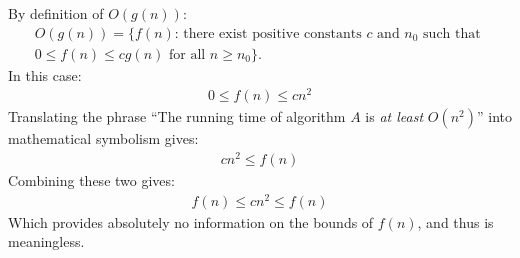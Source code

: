 By definition of $O(g(n))$:
\begin{eqnarray*}
	O(g(n)) = \{f(n) \text{: there exist positive constants } c \text{ and } n_0 \text{ such that } \\
	0 \leq f(n) \leq c g(n) \text{ for all } n \geq n_0 \}.
\end{eqnarray*}
In this case:
\begin{eqnarray*}
	0 \leq f(n) \leq c n^2
\end{eqnarray*}
Translating the phrase ``The running time of algorithm $A$ is \textit{at least} $O(n^2)$'' into mathematical symbolism gives:
\begin{eqnarray*}
	c n^2 \leq f(n)
\end{eqnarray*}
Combining these two gives:
\begin{eqnarray*}
	f(n) \leq c n^2 \leq f(n)
\end{eqnarray*}
Which provides absolutely no information on the bounds of $f(n)$, and thus is meaningless.
